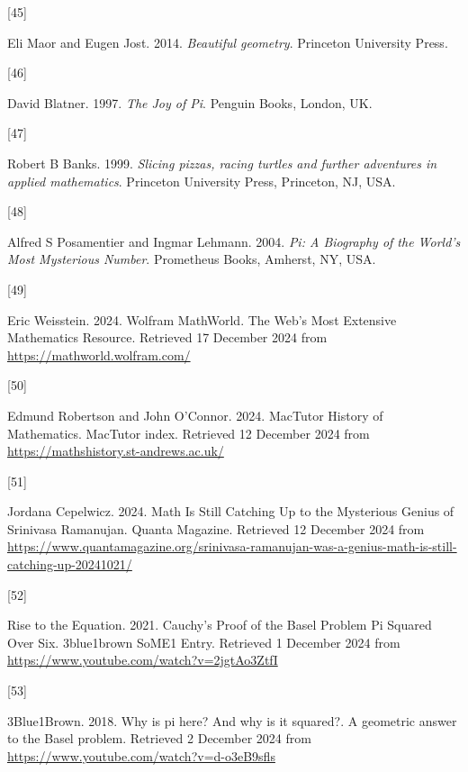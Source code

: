 \documentclass[
  a4paper,
]{article}
\newlength{\cslhangindent}
\newlength{\csllabelwidth}
\newenvironment{CSLReferences}[2] %
 {\begin{list}{}{%
  \setlength{\itemindent}{0pt}
  \setlength{\leftmargin}{0pt}
  \setlength{\parsep}{0pt}
  \ifodd #1
   \setlength{\leftmargin}{\cslhangindent}
   \setlength{\itemindent}{-1\cslhangindent}
  \fi
  \setlength{\itemsep}{#2\baselineskip}}}
 {\end{list}}
\newcommand{\CSLLeftMargin}[1]{\parbox[t]{\csllabelwidth}{\strut#1\strut}}
\newcommand{\CSLRightInline}[1]{\parbox[t]{\linewidth - \csllabelwidth}{\strut#1\strut}}
\begin{document}
\begin{CSLReferences}{0}{0}
\CSLLeftMargin{{[}45{]} }%
\CSLRightInline{Eli Maor and Eugen Jost. 2014. \emph{Beautiful
geometry}. Princeton University Press.}

\CSLLeftMargin{{[}46{]} }%
\CSLRightInline{David Blatner. 1997. \emph{{The Joy of Pi}}. Penguin
Books, London, UK.}

\CSLLeftMargin{{[}47{]} }%
\CSLRightInline{Robert B Banks. 1999. \emph{{Slicing pizzas, racing
turtles and further adventures in applied mathematics}}. Princeton
University Press, Princeton, NJ, USA.}

\CSLLeftMargin{{[}48{]} }%
\CSLRightInline{Alfred S Posamentier and Ingmar Lehmann. 2004.
\emph{{Pi: A Biography of the World's Most Mysterious Number}}.
Prometheus Books, Amherst, NY, USA.}

\CSLLeftMargin{{[}49{]} }%
\CSLRightInline{Eric Weisstein. 2024. {Wolfram MathWorld}. {The Web's
Most Extensive Mathematics Resource}. Retrieved 17 December 2024 from
\url{https://mathworld.wolfram.com/}}

\CSLLeftMargin{{[}50{]} }%
\CSLRightInline{Edmund Robertson and John O'Connor. 2024. {MacTutor
History of Mathematics}. MacTutor index. Retrieved 12 December 2024 from
\url{https://mathshistory.st-andrews.ac.uk/}}

\CSLLeftMargin{{[}51{]} }%
\CSLRightInline{Jordana Cepelwicz. 2024. {Math Is Still Catching Up to
the Mysterious Genius of Srinivasa Ramanujan}. {Quanta Magazine}.
Retrieved 12 December 2024 from
\url{https://www.quantamagazine.org/srinivasa-ramanujan-was-a-genius-math-is-still-catching-up-20241021/}}

\CSLLeftMargin{{[}52{]} }%
\CSLRightInline{Rise to the Equation. 2021. {Cauchy's Proof of the Basel
Problem \textbar{} Pi Squared Over Six}. {3blue1brown SoME1 Entry}.
Retrieved 1 December 2024 from
\url{https://www.youtube.com/watch?v=2jgtAo3ZtfI}}

\CSLLeftMargin{{[}53{]} }%
\CSLRightInline{3Blue1Brown. 2018. {Why is pi here? And why is it
squared?}. {A geometric answer to the Basel problem}. Retrieved 2
December 2024 from \url{https://www.youtube.com/watch?v=d-o3eB9sfls}}

\end{CSLReferences}
\end{document}
